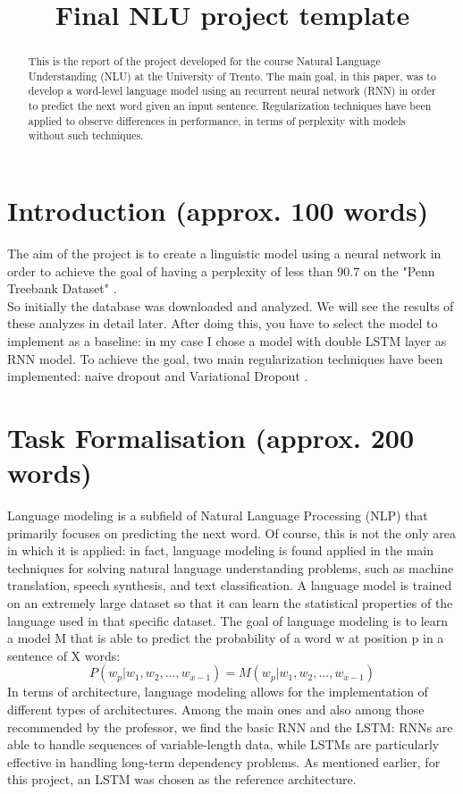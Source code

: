 \documentclass[a4paper]{article}
\title{Final NLU project template}
\begin{document}
\maketitle


\begin{abstract}
This is the report of the project developed for the course Natural Language Understanding (NLU) at the University of Trento. The main goal, in this paper, was to develop a word-level language model using an recurrent neural network (RNN) in order to predict the next word given an input sentence. Regularization techniques have been applied to observe differences in performance, in terms of perplexity with models without such techniques.
\end{abstract}
\section{Introduction (approx. 100 words)} 
The aim of the project is to create a linguistic model using a neural network in order to achieve the goal of having a perplexity of less than 90.7 on the "Penn Treebank Dataset" \cite{marcus-etal-ptb}.\\
So initially the database was downloaded and analyzed. We will see the results of these analyzes in detail later. After doing this, you have to select the model to implement as a baseline: in my case I chose a model with double LSTM layer as RNN model.
To achieve the goal, two main regularization techniques have been implemented: naive dropout \cite{zaremba-rnn}  and Variational Dropout \cite{gal-dropout}.\\
    

\section{Task Formalisation (approx. 200 words)}

Language modeling is a subfield of Natural Language Processing (NLP) that primarily focuses on predicting the next word. Of course, this is not the only area in which it is applied: in fact, language modeling is found applied in the main techniques for solving natural language understanding problems, such as machine translation, speech synthesis, and text classification.
A language model is trained on an extremely large dataset so that it can learn the statistical properties of the language used in that specific dataset.
The goal of language modeling is to learn a model M that is able to predict the probability of a word w at position p in a sentence of X words:
\[P(w_p|w_1, w_2, ..., w_{x-1}) = M(w_p|w_1, w_2, ..., w_{x-1})\]
In terms of architecture, language modeling allows for the implementation of different types of architectures. Among the main ones and also among those recommended by the professor, we find the basic RNN and the LSTM: RNNs are able to handle sequences of variable-length data, while LSTMs are particularly effective in handling long-term dependency problems.
As mentioned earlier, for this project, an LSTM was chosen as the reference architecture.
\end{document}
